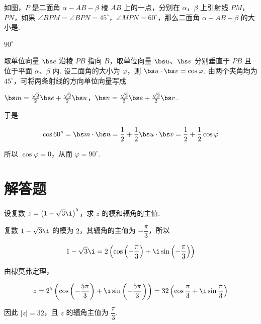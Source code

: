 \documentclass[UTF8,a4paper,oneside,11pt]{ctexbook}
\begin{document}
\begin{problem}
如图，\(P\) 是二面角 \(\alpha - AB - \beta\) 棱 \(AB\) 上的一点，分别在 \(\alpha\)，\(\beta\) 上引射线 \(PM\)，\(PN\)，如果 \(\angle BPM = \angle BPN = 45^\circ\)，\(\angle MPN = 60^\circ\)，那么二面角 \(\alpha - AB - \beta\) 的大小是\fillinblank{}.

\end{problem}

\begin{answer}
\(90^\circ\)
\end{answer}

\begin{solution}
取单位向量 \(\bs e\) 沿棱 \(PB\) 指向 \(B\)，取单位向量 \(\bs u\)、\(\bs v\) 分别垂直于 \(PB\) 且位于平面 \(\alpha\)、\(\beta\) 内. 设二面角的大小为 \(\varphi\)，则 \(\bs u\cdot\bs v=\cos\varphi\). 由两个夹角均为 \(45^\circ\)，可将两条射线的方向单位向量写成

\(\bs m=\frac{\sqrt2}{2}\bs e+\frac{\sqrt2}{2}\bs u\)，\(\bs n=\frac{\sqrt2}{2}\bs e+\frac{\sqrt2}{2}\bs v\).

于是

\[\cos60^\circ=\bs m\cdot\bs n=\frac12+\frac12\bs u\cdot\bs v=\frac12+\frac12\cos\varphi\]

所以 \(\cos\varphi=0\)，从而 \(\varphi=90^\circ\).
\end{solution}

\section{解答题}

\begin{problem}
设复数 \(z = \left(1 - \sqrt{3}\i\right)^5\)，求 \(z\) 的模和辐角的主值.
\end{problem}

\begin{solution}
复数 \(1-\sqrt3\i\) 的模为 \(2\)，其辐角的主值为 \(-\dfrac\pi3\)，所以

\[1-\sqrt3\i=2\left(\cos\left(-\frac\pi3\right)+\i\sin\left(-\frac\pi3\right)\right)\]

由棣莫弗定理，

\[z=2^5\left(\cos\left(-\frac{5\pi}{3}\right)+\i\sin\left(-\frac{5\pi}{3}\right)\right)=32\left(\cos\frac\pi3+\i\sin\frac\pi3\right)\]

因此 \(\lvert z\rvert=32\)，且 \(z\) 的辐角主值为 \(\dfrac\pi3\).
\end{solution}
\end{document}
